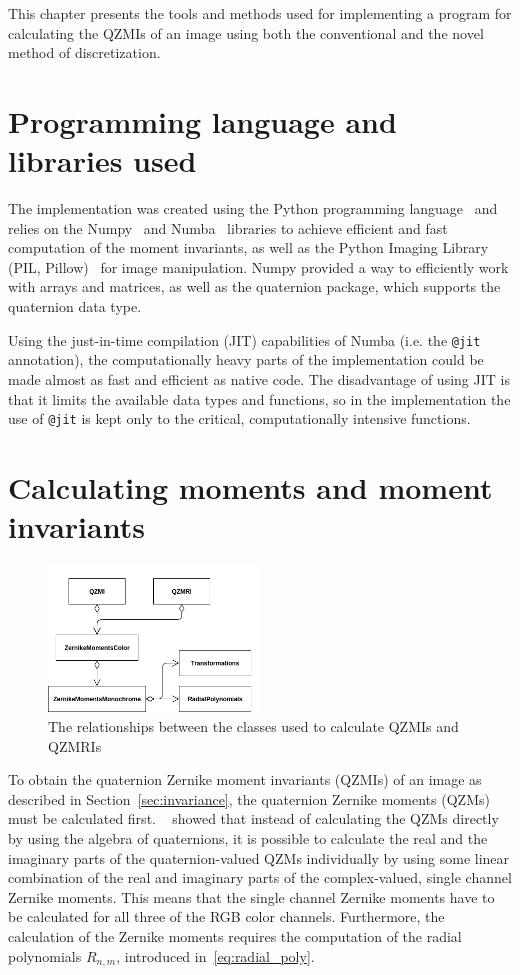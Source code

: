 This chapter presents the tools and methods used for implementing a program for calculating the QZMIs of an image using both the conventional and the novel method of discretization.

\section{Programming language and libraries used}
The implementation was created using the Python programming language~\cite{python} and relies on the Numpy~\cite{numpy} and Numba~\cite{numba} libraries to achieve efficient and fast computation of the moment invariants, as well as the Python Imaging Library (PIL, Pillow)~\cite{pil} for image manipulation.
Numpy provided a way to efficiently work with arrays and matrices, as well as the quaternion package, which supports the quaternion data type.

Using the just-in-time compilation (JIT) capabilities of Numba (i.e. the \texttt{@jit} annotation), the computationally heavy parts of the implementation could be made almost as fast and efficient as native code. The disadvantage of using JIT is that it limits the available data types and functions, so in the implementation the use of \texttt{@jit} is kept only to the critical, computationally intensive functions. 

\section{Calculating moments and moment invariants}
\begin{figure}[tbp]
    \centering
        \includegraphics[width=0.5\textwidth]{figures/qzmi_classes.png}
    \caption{The relationships between the classes used to calculate QZMIs and QZMRIs}
    \label{fig:classes}
\end{figure}
To obtain the quaternion Zernike moment invariants (QZMIs) of an image as described in Section~\ref{sec:invariance}, the quaternion Zernike moments (QZMs) must be calculated first. \citeauthor{qzmi}~\cite{qzmi} showed that instead of calculating the QZMs directly by using the algebra of quaternions, it is possible to calculate the real and the imaginary parts of the quaternion-valued QZMs individually by using some linear combination of the real and imaginary parts of the complex-valued, single channel Zernike moments. This means that the single channel Zernike moments have to be calculated for all three of the RGB color channels.
Furthermore, the calculation of the Zernike moments requires the computation of the radial polynomials $R_{n,m}$, introduced in~\eqref{eq:radial_poly}.

